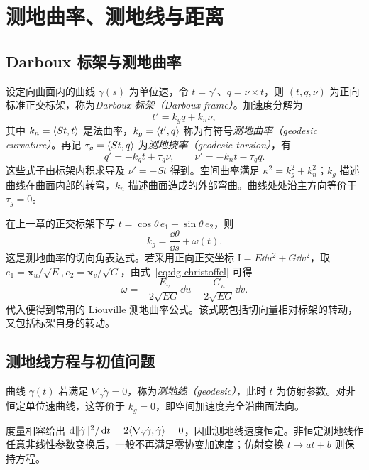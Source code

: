 \setcounter{chapter}{8} %
\chapter{测地曲率、测地线与距离}
\label{chap:dg-geodesics}

\section{Darboux 标架与测地曲率}
设定向曲面内的曲线 $\gamma(s)$ 为单位速，令 $t=\gamma'$、$q=\nu\times t$，则 $(t,q,\nu)$ 为正向标准正交标架，称为\emph{Darboux 标架（Darboux frame）}。加速度分解为
\begin{equation}
 t'=k_gq+k_n\nu,
 \label{eq:dg-darboux-first}
\end{equation}
其中 $k_n=\langle St,t\rangle$ 是法曲率，$k_g=\langle t',q\rangle$ 称为有符号\emph{测地曲率（geodesic curvature）}。再记 $\tau_g=\langle St,q\rangle$ 为\emph{测地挠率（geodesic torsion）}，有
\[
 q'=-k_gt+\tau_g\nu,\qquad \nu'=-k_nt-\tau_gq.
\]
这些式子由标架内积求导及 $\nu'=-St$ 得到。空间曲率满足 $\kappa^2=k_g^2+k_n^2$；$k_g$ 描述曲线在曲面内部的转弯，$k_n$ 描述曲面造成的外部弯曲。曲线处处沿主方向等价于 $\tau_g=0$。

在上一章的正交标架下写 $t=\cos\theta\,e_1+\sin\theta\,e_2$，则
\begin{equation}
 k_g=\frac{\dd\theta}{\dd s}+\omega(t).
 \label{eq:dg-kg-angle}
\end{equation}
这是测地曲率的切向角表达式。若采用正向正交坐标 $\mathrm I=E\dd u^2+G\dd v^2$，取 $e_1=\mathbf x_u/\sqrt E,e_2=\mathbf x_v/\sqrt G$，由式~\eqref{eq:dg-christoffel} 可得
\[
 \omega=-\frac{E_v}{2\sqrt{EG}}\dd u+
          \frac{G_u}{2\sqrt{EG}}\dd v.
\]
代入便得到常用的 Liouville 测地曲率公式。该式既包括切向量相对标架的转动，又包括标架自身的转动。

\section{测地线方程与初值问题}
\begin{definition}[仿射参数测地线]
曲线 $\gamma(t)$ 若满足 $\nabla_{\dot\gamma}\dot\gamma=0$，称为\emph{测地线（geodesic）}，此时 $t$ 为仿射参数。对非恒定单位速曲线，这等价于 $k_g=0$，即空间加速度完全沿曲面法向。
\end{definition}
度量相容给出 $\mathop{}\!\mathrm d\lVert \dot\gamma\rVert^2/\mathop{}\!\mathrm d t=2\langle \nabla_{\dot\gamma}\dot\gamma,\dot\gamma\rangle=0$，因此测地线速度恒定。非恒定测地线作任意非线性参数变换后，一般不再满足零协变加速度；仿射变换 $t\mapsto at+b$ 则保持方程。

